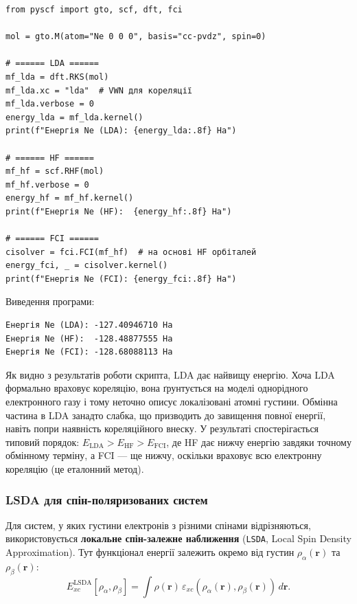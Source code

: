 \begin{verbatim}
from pyscf import gto, scf, dft, fci

mol = gto.M(atom="Ne 0 0 0", basis="cc-pvdz", spin=0)

# ====== LDA ======
mf_lda = dft.RKS(mol)
mf_lda.xc = "lda"  # VWN для кореляції
mf_lda.verbose = 0
energy_lda = mf_lda.kernel()
print(f"Енергія Ne (LDA): {energy_lda:.8f} Ha")

# ====== HF ======
mf_hf = scf.RHF(mol)
mf_hf.verbose = 0
energy_hf = mf_hf.kernel()
print(f"Енергія Ne (HF):  {energy_hf:.8f} Ha")

# ====== FCI ======
cisolver = fci.FCI(mf_hf)  # на основі HF орбіталей
energy_fci, _ = cisolver.kernel()
print(f"Енергія Ne (FCI): {energy_fci:.8f} Ha")
\end{verbatim}

Виведення програми:
\begin{verbatim}
Енергія Ne (LDA): -127.40946710 Ha
Енергія Ne (HF):  -128.48877555 Ha
Енергія Ne (FCI): -128.68088113 Ha
\end{verbatim}
Як видно з результатів роботи скрипта, LDA дає найвищу енергію. Хоча LDA формально враховує кореляцію, вона ґрунтується на моделі однорідного електронного газу і тому неточно описує локалізовані атомні густини. Обмінна частина в LDA занадто слабка, що призводить до завищення повної енергії, навіть попри наявність кореляційного внеску. У результаті спостерігається типовий порядок: $E_{\text{LDA}} > E_{\text{HF}} > E_{\text{FCI}}$, де HF дає нижчу енергію завдяки точному обмінному терміну, а FCI --- ще нижчу, оскільки враховує всю електронну кореляцію (це еталонний метод).

\subsubsection{LSDA для спін-поляризованих систем}

Для систем, у яких густини електронів з різними спінами відрізняються, використовується \textbf{локальне спін-залежне наближення} (\texttt{LSDA}, Local Spin Density Approximation).
Тут функціонал енергії залежить окремо від густин $\rho_\alpha(\mathbf{r})$ та $\rho_\beta(\mathbf{r})$:
\begin{equation}
E_{xc}^{\text{LSDA}}[\rho_\alpha, \rho_\beta]
= \int \rho(\mathbf{r})\, \varepsilon_{xc}(\rho_\alpha(\mathbf{r}), \rho_\beta(\mathbf{r}))\, d\mathbf{r}.
\end{equation}

